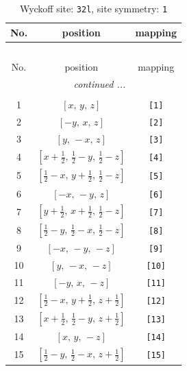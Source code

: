 \documentclass[fleqn,8pt]{jsarticle}
\begin{document}
\renewcommand{\arraystretch}{1.2}
\begin{longtable}{ccc}
\caption{Wyckoff site: {\tt 32l}, site symmetry: {\tt 1}}
 \\
 \hline \hline
No. & position & mapping \\ \hline \endfirsthead

\multicolumn{2}{l}{\tablename\ \thetable{}} \\
 \hline \hline
No. & position & mapping \\ \hline \endhead

 \hline \hline
\multicolumn{2}{r}{\footnotesize\it continued ...} \\ \endfoot

 \hline \hline
\multicolumn{2}{r}{} \\ \endlastfoot

1 & $\left[ x,\, y,\, z \right]$ & {\tt [1]} \\ \hline
2 & $\left[ - y,\, x,\, z \right]$ & {\tt [2]} \\ \hline
3 & $\left[ y,\, - x,\, z \right]$ & {\tt [3]} \\ \hline
4 & $\left[ x + \frac{1}{2},\, \frac{1}{2} - y,\, \frac{1}{2} - z \right]$ & {\tt [4]} \\ \hline
5 & $\left[ \frac{1}{2} - x,\, y + \frac{1}{2},\, \frac{1}{2} - z \right]$ & {\tt [5]} \\ \hline
6 & $\left[ - x,\, - y,\, z \right]$ & {\tt [6]} \\ \hline
7 & $\left[ y + \frac{1}{2},\, x + \frac{1}{2},\, \frac{1}{2} - z \right]$ & {\tt [7]} \\ \hline
8 & $\left[ \frac{1}{2} - y,\, \frac{1}{2} - x,\, \frac{1}{2} - z \right]$ & {\tt [8]} \\ \hline
9 & $\left[ - x,\, - y,\, - z \right]$ & {\tt [9]} \\ \hline
10 & $\left[ y,\, - x,\, - z \right]$ & {\tt [10]} \\ \hline
11 & $\left[ - y,\, x,\, - z \right]$ & {\tt [11]} \\ \hline
12 & $\left[ \frac{1}{2} - x,\, y + \frac{1}{2},\, z + \frac{1}{2} \right]$ & {\tt [12]} \\ \hline
13 & $\left[ x + \frac{1}{2},\, \frac{1}{2} - y,\, z + \frac{1}{2} \right]$ & {\tt [13]} \\ \hline
14 & $\left[ x,\, y,\, - z \right]$ & {\tt [14]} \\ \hline
15 & $\left[ \frac{1}{2} - y,\, \frac{1}{2} - x,\, z + \frac{1}{2} \right]$ & {\tt [15]} \\ \hline

\end{longtable}
\end{document}
